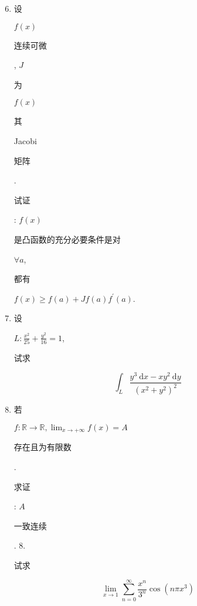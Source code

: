 \documentclass[10pt]{article}
\begin{document}
\begin{enumerate}
  \setcounter{enumi}{5}
  \item \begin{CJK}{UTF8}{mj}设\end{CJK} $f(x)$ \begin{CJK}{UTF8}{mj}连续可微\end{CJK}, $J$ \begin{CJK}{UTF8}{mj}为\end{CJK} $f(x)$ \begin{CJK}{UTF8}{mj}其\end{CJK} Jacobi \begin{CJK}{UTF8}{mj}矩阵\end{CJK}. \begin{CJK}{UTF8}{mj}试证\end{CJK}: $f(x)$ \begin{CJK}{UTF8}{mj}是凸函数的充分必要条件是对\end{CJK} $\forall a$, \begin{CJK}{UTF8}{mj}都有\end{CJK} $f(x) \geq f(a)+J f(a) f^{\prime}(a)$.

  \item \begin{CJK}{UTF8}{mj}设\end{CJK} $L: \frac{x^{2}}{25}+\frac{y^{2}}{16}=1$, \begin{CJK}{UTF8}{mj}试求\end{CJK}

\end{enumerate}
$$
\int_{L} \frac{y^{3} \mathrm{~d} x-x y^{2} \mathrm{~d} y}{\left(x^{2}+y^{2}\right)^{2}}
$$

\begin{enumerate}
  \setcounter{enumi}{7}
  \item \begin{CJK}{UTF8}{mj}若\end{CJK} $f: \mathbb{R} \rightarrow \mathbb{R}, \lim _{x \rightarrow+\infty} f(x)=A$ \begin{CJK}{UTF8}{mj}存在且为有限数\end{CJK}. \begin{CJK}{UTF8}{mj}求证\end{CJK}: $A$ \begin{CJK}{UTF8}{mj}一致连续\end{CJK}. 8. \begin{CJK}{UTF8}{mj}试求\end{CJK}
\end{enumerate}
$$
\lim _{x \rightarrow 1} \sum_{n=0}^{\infty} \frac{x^{n}}{3^{n}} \cos \left(n \pi x^{3}\right)
$$
\end{document}
